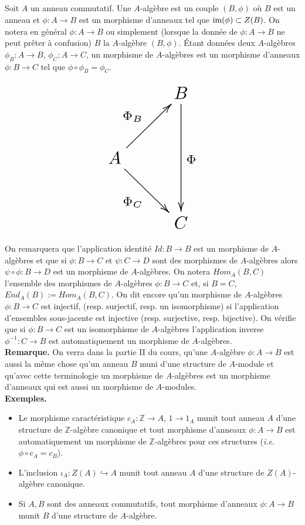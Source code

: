 \documentclass[a4paper, oneside, 12pt]{book}
\theoremstyle{definition} %
\newcommand{\ie}{\textit{i.e.}} %
\newcommand{\Z}{\mathbb{Z}}
\begin{document}
\subsection{}Soit $A$ un anneau commutatif. Une $A$-algèbre est un couple $(B,\phi)$ où $B$ est  un anneau et  $\phi:A\rightarrow B$ est un morphisme d'anneaux tel que $\hbox{\rm im}(\phi)\subset Z(B)$.   On notera en général $\phi:A\rightarrow B$ ou simplement  (lorsque la donnée de $\phi:A\rightarrow B$ ne peut prêter à confusion) $B$  la $A$-algèbre $(B,\phi)$.
Étant données deux $A$-algèbres $\phi_B:A\rightarrow B$, $\phi_C:A\rightarrow C$, un morphisme de $A$-algèbres est un morphisme d'anneaux $\phi:B\rightarrow C$ tel que $\phi\circ \phi_B=\phi_C$.

$$ \resizebox{120px}{!}{\xymatrix{ & B \ar[dd]^\Phi \\ A \ar[ru]^{\Phi_B} \ar[rd]_{\Phi_C} \\ & C }} $$

On remarquera que l'application identité $Id:B\rightarrow B$ est un morphisme de $A$-algèbres et que si $\phi:B\rightarrow C$ et $\psi:C\rightarrow D$ sont des morphismes de $A$-algèbres alors $\psi\circ \phi:B\rightarrow D$ est un morphisme de $A$-algèbres. On notera $Hom_A(B,C)$ l'ensemble des morphismes de $A$-algèbres $\phi:B\rightarrow C$ et, si $B=C$, $End_A(B):=Hom_A(B,C)$. On dit encore qu'un morphisme de $A$-algèbres $\phi:B\rightarrow C$ est injectif, (resp. surjectif, resp. un isomorphisme) si l'application d'ensembles sous-jacente est  injective (resp. surjective, resp. bijective). On vérifie que si $\phi:B\rightarrow C$ est un isomorphisme de $A$-algèbres l'application inverse $\phi^{-1}:C\rightarrow B$ est automatiquement un morphisme de $A$-algèbres.\\

 \textbf{Remarque.} On verra dans la partie II du cours, qu'une $A$-algèbre $\phi:A\rightarrow B$ est aussi la même chose qu'un anneau $B$ muni d'une structure de $A$-module  et qu'avec cette terminologie un morphisme de $A$-algèbres est un morphisme d'anneaux qui est aussi un morphisme de $A$-modules.  \\  

\textbf{Exemples.}
\begin{itemize}[leftmargin=* ,parsep=0cm,itemsep=0cm,topsep=0cm]
\item Le morphisme caractéristique $c_A:\Z\rightarrow A$, $1\rightarrow 1_A$ munit tout anneau $A$ d'une structure de $\Z$-algèbre canonique et tout morphisme d'anneaux $\phi:A\rightarrow B$ est automatiquement un morphisme de $\Z$-algèbres pour ces structures (\ie{} $\phi\circ c_A=c_B$).   
\item L'inclusion $\iota_A: Z(A)\hookrightarrow  A $  munit tout anneau $A$ d'une structure de $Z(A)$-algèbre canonique. 
\item Si $A,B$ sont des anneaux commutatifs, tout morphisme d'anneaux $\phi:A\rightarrow B$ munit $B$ d'une structure de $A$-algèbre.\\
\end{itemize}
\end{document}
